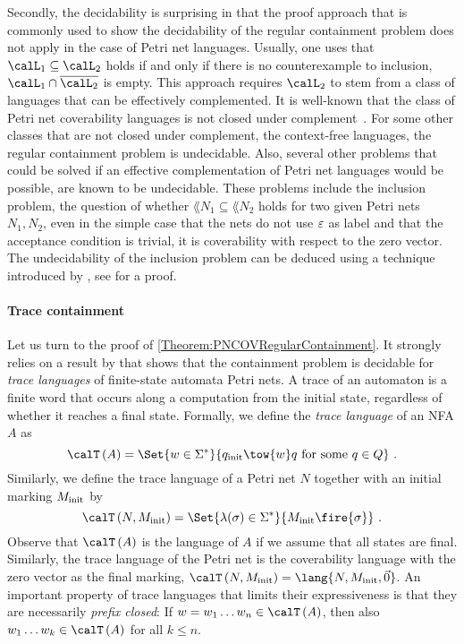 \documentclass[../../diss.tex]{subfiles}
\begin{document}
Secondly, the decidability is surprising in that the proof approach that is commonly used to show the decidability of the regular containment problem does not apply in the case of Petri net languages.
Usually, one uses that $\calL_1 \subseteq \calL_2$ holds if and only if there is no counterexample to inclusion, \ie $\calL_1 \cap \overline{\calL_2}$ is empty.
This approach requires $\calL_2$ to stem from a class of languages that can be effectively complemented.
It is well-known that the class of Petri net coverability languages is not closed under complement~\cite{MukundKRS98,MukundKRS98b}.
For some other classes that are not closed under complement, \eg the context-free languages, the regular containment problem is undecidable.
Also, several other problems that could be solved if an effective complementation of Petri net languages would be possible, are known to be undecidable.
These problems include the inclusion problem, \ie the question of whether $\lang{N_1} \subseteq \lang{N_2}$ holds for two given Petri nets $N_1, N_2$, even in the simple case that the nets do not use $\varepsilon$ as label and that the acceptance condition is trivial, \ie it is coverability with respect to the zero vector.
The undecidability of the inclusion problem can be deduced using a technique introduced by , see \eg \cite{Wimmel08} for a proof.

\paragraph{Trace containment}

Let us turn to the proof of \cref{Theorem:PNCOVRegularContainment}.
It strongly relies on a result by  that shows that the containment problem is decidable for \emph{trace languages} of finite-state automata \resp Petri nets.
A trace of an automaton is a finite word that occurs along a computation from the initial state, regardless of whether it reaches a final state.
Formally, we define the \emph{trace language} of an NFA $A$ as
\[
     \Traces{A} = \Set{ w \in \Sigma^* }{ q_\init \tow{w} q \text{ for some } q \in Q }
     \ .
\]
Similarly, we define the trace language of a Petri net $N$ together with an initial marking $M_{\text{init}}$ by
\[
    \Traces{N,\Minit} = \Set{ \lambda(\sigma) \in \Sigma^*}{
                \Minit \fire{\sigma}
        }
    \ .
\]
Observe that $\Traces{A}$ is the language of $A$ if we assume that all states are final.
Similarly, the trace language of the Petri net is the coverability language with the zero vector as the final marking, $\Traces{N,\Minit} = \lang{N,\Minit,\vec{0}}$.
An important property of trace languages that limits their expressiveness is that they are necessarily \emph{prefix closed}: If $w = w_1 \ldots w_n \in \Traces{A}$, then also $w_1 \ldots w_k \in \Traces{A}$ for all $k \leq n$.
\end{document}
